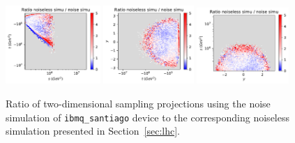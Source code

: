 \documentclass[twocolumn,preprintnumbers,superscriptaddress]{revtex4-2}
\begin{document}
\begin{figure}

  \includegraphics[width=0.32\textwidth]{plots/hardware_noise_simulation/s-t_RATIO_100k_noiseless-noise.pdf}%
  \includegraphics[width=0.305\textwidth]{plots/hardware_noise_simulation/t-y_RATIO_100k_noiseless-noise.pdf}%
  \includegraphics[width=0.31\textwidth]{plots/hardware_noise_simulation/y-s_RATIO_100k_noiseless-noise.pdf}

  \caption{\label{fig:ibmnoise2}Ratio of two-dimensional sampling projections using the noise simulation of {\tt ibmq\_santiago} device to the
    corresponding noiseless simulation presented in Section~\ref{sec:lhc}.}
\end{figure}

\clearpage


\end{document}
